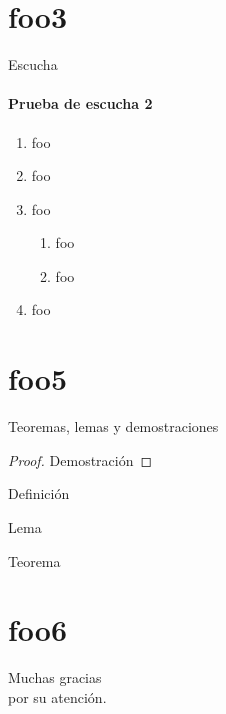 \documentclass[a4paper]{beamer}
\begin{document}
\section{foo3}
\begin{frame}[<+->]{Escucha}
\framesubtitle{Prueba de escucha 2}
\begin{enumerate}
\item foo
\item foo
\item foo
\begin{enumerate}
\item foo
\item foo
\end{enumerate}
\item foo
\end{enumerate}
\end{frame}

\section{foo5}
\begin{frame}{Teoremas, lemas y 
demostraciones}
\begin{proof}
        Demostraci\'on
\end{proof}

\begin{definition}
        Definici\'on
\end{definition}

\begin{lemma}[Enunciado]
        Lema
\end{lemma}

\begin{theorem}[Sentencia]
        Teorema
\end{theorem}
\end{frame}

\section{foo6}
\begin{frame}
\vfill
\begin{center}\begin{Huge}Muchas gracias \\[10pt]
por su atenci\'on.\end{Huge}\vfill
\end{center}
\vfill
\end{frame}
\end{document}

